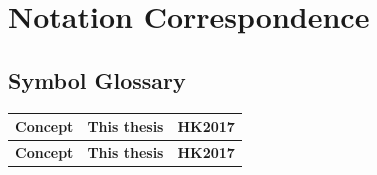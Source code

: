 %
%
\section{Notation Correspondence}\label{sec:correspondence}


\subsection{Symbol Glossary}\label{subsec:symbols}

\begin{longtable}{p{5.5cm} p{3.5cm} p{3.5cm}}
\toprule
\textbf{Concept} & \textbf{This thesis} & \textbf{HK2017} \\
\midrule
\endfirsthead
\midrule
\textbf{Concept} & \textbf{This thesis} & \textbf{HK2017} \\
\midrule
\endhead


\end{longtable}
